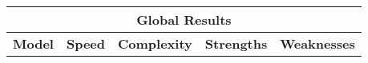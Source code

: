 \begin{center}
    \begin{tabular}{|c|c|c|c|c|}
        \hline
        \multicolumn{5}{|c|}{\textbf{Global Results}} \\
        \hline
        \textbf{Model} & \textbf{Speed} & \textbf{Complexity} & \textbf{Strengths} & \textbf{Weaknesses} \\
        \hline
    \end{tabular}
\end{center}